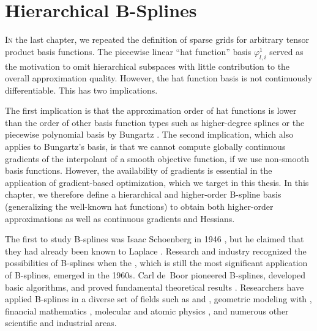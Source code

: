 
\chapter{Hierarchical B-Splines}
\label{chap:30BSplines}



\lettrine{I}{n} the last chapter,
we repeated the definition of sparse grids for
arbitrary tensor product basis functions.
The piecewise linear ``hat function'' basis $\varphi_{l,i}^1$
served as the motivation to omit hierarchical subspaces with
little contribution to the overall approximation quality.
However, the hat function basis is not continuously differentiable.
This has two implications.


The first implication is that the approximation order of hat functions
is lower than the order of other basis function types
such as higher-degree splines \cite{Sickel11Spline}
or the piecewise polynomial basis by Bungartz \cite{Bungartz98Finite}.
The second implication, which also applies to Bungartz's basis,
is that we cannot compute globally continuous gradients of the
interpolant of a smooth objective function,
if we use non-smooth basis functions.
However, the availability of gradients is
essential in the application of gradient-based optimization,
which we target in this thesis.
In this chapter, we therefore define a hierarchical and
higher-order B-spline basis
(generalizing the well-known hat functions)
to obtain both higher-order approximations
as well as continuous gradients and Hessians.

The first to study B-splines was Isaac Schoenberg in 1946
\cite{Schoenberg46Contributions},
but he claimed that they had already been known to Laplace
\cite{Boor76Splines}.
Research and industry recognized the possibilities of B-splines when
the \fem, which is still the most significant application of B-splines,
emerged in the 1960s.
Carl de~Boor pioneered B-splines, developed basic algorithms, and
proved fundamental theoretical results \cite{Boor72Calculating}.
Researchers have applied B-splines in a diverse set of fields such as
\fem \cite{Hoellig03Finite} and \iga \cite{Hoellig12Finite},
geometric modeling with \nurbs \cite{Cohen01Geometric,Hoellig13Approximation},
financial mathematics \cite{Pflueger10Spatially},
molecular and atomic physics
\cite{Bachau01Applications,McCurdy04Implementation},
and numerous other scientific and industrial areas.

